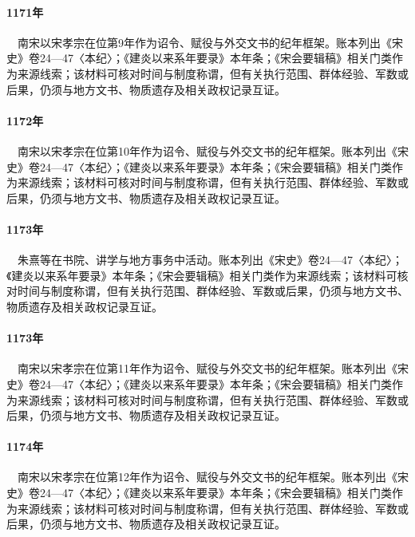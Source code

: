 \paragraph{1171年}　南宋以宋孝宗在位第9年作为诏令、赋役与外交文书的纪年框架。账本列出《宋史》卷24—47〈本纪〉；《建炎以来系年要录》本年条；《宋会要辑稿》相关门类作为来源线索；该材料可核对时间与制度称谓，但有关执行范围、群体经验、军数或后果，仍须与地方文书、物质遗存及相关政权记录互证。

\paragraph{1172年}　南宋以宋孝宗在位第10年作为诏令、赋役与外交文书的纪年框架。账本列出《宋史》卷24—47〈本纪〉；《建炎以来系年要录》本年条；《宋会要辑稿》相关门类作为来源线索；该材料可核对时间与制度称谓，但有关执行范围、群体经验、军数或后果，仍须与地方文书、物质遗存及相关政权记录互证。

\paragraph{1173年}　朱熹等在书院、讲学与地方事务中活动。账本列出《宋史》卷24—47〈本纪〉；《建炎以来系年要录》本年条；《宋会要辑稿》相关门类作为来源线索；该材料可核对时间与制度称谓，但有关执行范围、群体经验、军数或后果，仍须与地方文书、物质遗存及相关政权记录互证。

\paragraph{1173年}　南宋以宋孝宗在位第11年作为诏令、赋役与外交文书的纪年框架。账本列出《宋史》卷24—47〈本纪〉；《建炎以来系年要录》本年条；《宋会要辑稿》相关门类作为来源线索；该材料可核对时间与制度称谓，但有关执行范围、群体经验、军数或后果，仍须与地方文书、物质遗存及相关政权记录互证。

\paragraph{1174年}　南宋以宋孝宗在位第12年作为诏令、赋役与外交文书的纪年框架。账本列出《宋史》卷24—47〈本纪〉；《建炎以来系年要录》本年条；《宋会要辑稿》相关门类作为来源线索；该材料可核对时间与制度称谓，但有关执行范围、群体经验、军数或后果，仍须与地方文书、物质遗存及相关政权记录互证。

